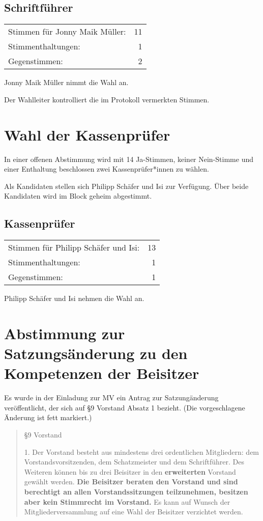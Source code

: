 \documentclass[DIV=calc,parksip=half*]{scrartcl}
\newcommand{\fiveop}{Philipp Schäfer}
\newcommand{\jonny}{Jonny Maik Müller}
\newcommand{\isi}{Isi}
\begin{document}
\subsection{Schriftführer}
\begin{tabularx}{\linewidth}{Xr}
Stimmen für \jonny{}: & 11\\
Stimmenthaltungen: & 1\\
Gegenstimmen: & 2
\end{tabularx}
\jonny{} nimmt die Wahl an.

Der Wahlleiter kontrolliert die im Protokoll vermerkten Stimmen.

\section{Wahl der Kassenprüfer}

In einer offenen Abstimmung wird mit 14 Ja-Stimmen, keiner Nein-Stimme und einer Enthaltung beschlossen zwei Kassenprüfer*innen zu wählen.

Als Kandidaten stellen sich \fiveop{} und \isi{} zur Verfügung. Über beide
Kandidaten wird im Block geheim abgestimmt.

\subsection{Kassenprüfer}
\begin{tabularx}{\linewidth}{Xr}
Stimmen für \fiveop{} und \isi{}: & 13\\
Stimmenthaltungen: & 1\\
Gegenstimmen: & 1
\end{tabularx}

\fiveop{} und \isi{} nehmen die Wahl an.

\section{Abstimmung zur Satzungsänderung zu den Kompetenzen der Beisitzer}

Es wurde in der Einladung zur MV ein Antrag zur Satzungänderung veröffentlicht, der sich auf §9 Vorstand Absatz 1 bezieht. (Die vorgeschlagene Änderung ist fett markiert.)

\begin{quote}
§9 Vorstand

 1. Der Vorstand besteht aus mindestens drei ordentlichen Mitgliedern: dem Vorstandsvorsitzenden, dem Schatzmeister und dem Schriftführer. Des Weiteren können bis zu drei Beisitzer in den \textbf{erweiterten} Vorstand gewählt werden. \textbf{Die Beisitzer beraten den Vorstand und sind berechtigt an allen Vorstandssitzungen teilzunehmen, besitzen aber kein Stimmrecht im Vorstand.} Es kann auf Wunsch der Mitgliederversammlung auf eine Wahl der Beisitzer verzichtet werden.
\end{quote}
\end{document}
